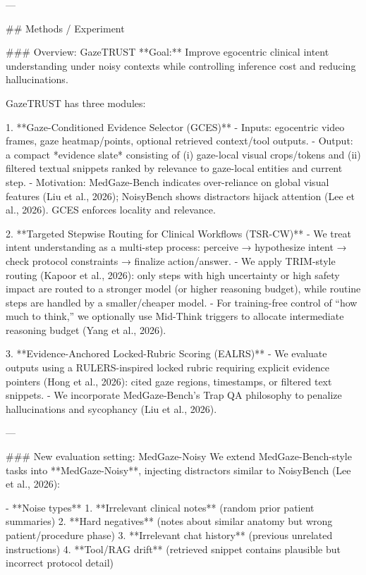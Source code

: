 ---

## Methods / Experiment  

### Overview: GazeTRUST  
**Goal:** Improve egocentric clinical intent understanding under noisy contexts while controlling inference cost and reducing hallucinations.

GazeTRUST has three modules:

1. **Gaze-Conditioned Evidence Selector (GCES)**  
   - Inputs: egocentric video frames, gaze heatmap/points, optional retrieved context/tool outputs.  
   - Output: a compact *evidence slate* consisting of (i) gaze-local visual crops/tokens and (ii) filtered textual snippets ranked by relevance to gaze-local entities and current step.  
   - Motivation: MedGaze-Bench indicates over-reliance on global visual features (Liu et al., 2026); NoisyBench shows distractors hijack attention (Lee et al., 2026). GCES enforces locality and relevance.

2. **Targeted Stepwise Routing for Clinical Workflows (TSR-CW)**  
   - We treat intent understanding as a multi-step process: perceive → hypothesize intent → check protocol constraints → finalize action/answer.  
   - We apply TRIM-style routing (Kapoor et al., 2026): only steps with high uncertainty or high safety impact are routed to a stronger model (or higher reasoning budget), while routine steps are handled by a smaller/cheaper model.  
   - For training-free control of “how much to think,” we optionally use Mid-Think triggers to allocate intermediate reasoning budget (Yang et al., 2026).

3. **Evidence-Anchored Locked-Rubric Scoring (EALRS)**  
   - We evaluate outputs using a RULERS-inspired locked rubric requiring explicit evidence pointers (Hong et al., 2026): cited gaze regions, timestamps, or filtered text snippets.  
   - We incorporate MedGaze-Bench’s Trap QA philosophy to penalize hallucinations and sycophancy (Liu et al., 2026).

---

### New evaluation setting: MedGaze-Noisy  
We extend MedGaze-Bench-style tasks into **MedGaze-Noisy**, injecting distractors similar to NoisyBench (Lee et al., 2026):

- **Noise types**
  1. **Irrelevant clinical notes** (random prior patient summaries)
  2. **Hard negatives** (notes about similar anatomy but wrong patient/procedure phase)
  3. **Irrelevant chat history** (previous unrelated instructions)
  4. **Tool/RAG drift** (retrieved snippet contains plausible but incorrect protocol detail)

